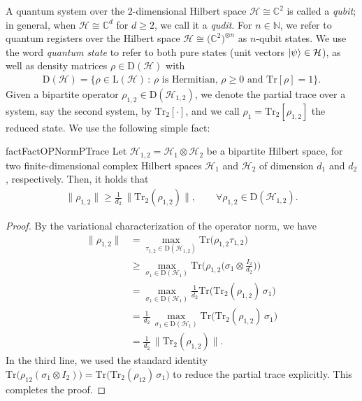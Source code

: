 \documentclass[a4paper,onecolumn,11pt]{quantumarticle}
\theoremstyle{plain}
\begin{document}
A quantum system over the $2$-dimensional Hilbert space $\mathcal H \cong \mathbb{C}^2$ is called a \emph{qubit}; in general, when $\mathcal H \cong \mathbb{C}^d$ for $d \geq 2$, we call it a \emph{qudit}. For $n \in \mathbb{N}$, we refer to quantum registers over the Hilbert space $\mathcal H \cong \big(\mathbb{C}^2\big)^{\otimes n}$ as $n$-qubit states. We use the word \emph{quantum state} to refer to both pure states (unit vectors $\ket{\psi} \in \mathcal H$), as well as density matrices $\rho \in \mathrm{D}(\mathcal H)$ with
\begin{align}
\mathrm{D}(\mathcal H) = \{ \rho \in \mathrm{L}(\mathcal{H}) \, : \, \rho \text{ is Hermitian, $\rho \geq 0$ and  } \mathrm{Tr}[\rho] =1\}.    
\end{align}
Given a bipartite operator $\rho_{1,2} \in \mathrm{D}(\mathcal H_{1,2})$, we denote the partial trace over a system, say the second system, by $\mathrm{Tr}_2[\cdot]$, and we call $\rho_1=\mathrm{Tr}_2[\rho_{1,2}]$ the reduced state. We use the following simple fact:
\begin{restatable}{fact}{FactOPNormPTrace} \label{fact:op-norm-ptrace}
    Let $\mathcal H_{1,2} = \mathcal H_{1} \otimes \mathcal H_{2}$ be a bipartite Hilbert space, for two finite-dimensional complex Hilbert spaces $\mathcal H_{1}$ and $\mathcal H_{2}$ of dimension $d_1$ and $d_2$, respectively. Then, it holds that
    \begin{align}
        \|\rho_{1,2}\| \geq \frac{1}{d_2} \, \|\mathrm{Tr}_2(\rho_{1,2})\|, \quad \quad \forall \rho_{1,2} \in \mathrm{D}(\mathcal H_{1,2}).
        \end{align}
\end{restatable}

\begin{proof}
By the variational characterization of the operator norm, we have
\begin{align*}
\|\rho_{1,2}\| 
&= \max_{\tau_{1,2} \in \mathrm{D}(\mathcal H_{1,2})} \mathrm{Tr}\big(\rho_{1,2} \tau_{1,2}\big) \\
&\ge \max_{\sigma_1 \in \mathrm{D}(\mathcal H_1)} \mathrm{Tr}\Big(\rho_{1,2} \big(\sigma_1 \otimes \frac{I_2}{d_2}\big)\Big) \\
&= \max_{\sigma_1 \in \mathrm{D}(\mathcal H_1)} \frac{1}{d_2} \mathrm{Tr}\big( \mathrm{Tr}_2(\rho_{1,2}) \, \sigma_1 \big) \\
&= \frac{1}{d_2} \, \max_{\sigma_1 \in \mathrm{D}(\mathcal H_1)} \mathrm{Tr}\big( \mathrm{Tr}_2(\rho_{1,2}) \, \sigma_1 \big) \\
&= \frac{1}{d_2} \, \|\mathrm{Tr}_2(\rho_{1,2})\|.
\end{align*}
In the third line, we used the standard identity $\mathrm{Tr}\big(\rho_{12} (\sigma_1 \otimes I_2)\big) = \mathrm{Tr}\big(\mathrm{Tr}_2(\rho_{12}) \, \sigma_1\big)$
to reduce the partial trace explicitly. This completes the proof.
\end{proof}
\end{document}
